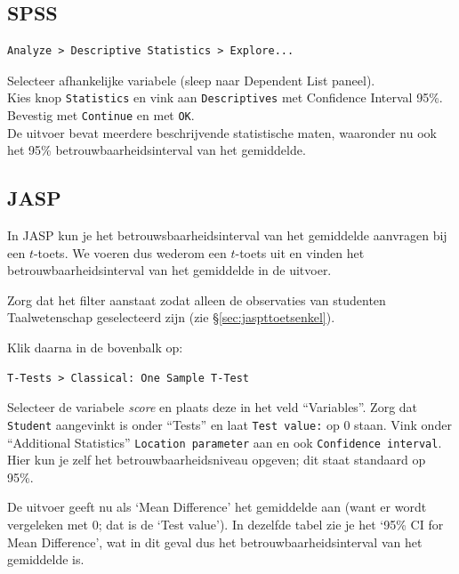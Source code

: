 \documentclass[
]{book}
\begin{document}
\hypertarget{spss-11}{%
\subsection{SPSS}\label{spss-11}}

\begin{verbatim}
Analyze > Descriptive Statistics > Explore...
\end{verbatim}

Selecteer afhankelijke variabele (sleep naar Dependent List paneel).\\
Kies knop \texttt{Statistics} en vink aan \texttt{Descriptives} met Confidence Interval
95\%.\\
Bevestig met \texttt{Continue} en met \texttt{OK}.\\
De uitvoer bevat meerdere beschrijvende statistische maten, waaronder nu
ook het 95\% betrouwbaarheidsinterval van het gemiddelde.

\hypertarget{jasp-12}{%
\subsection{JASP}\label{jasp-12}}

In JASP kun je het betrouwsbaarheidsinterval van het gemiddelde aanvragen bij een \(t\)-toets. We voeren dus wederom een \(t\)-toets uit en vinden het betrouwbaarheidsinterval van het gemiddelde in de uitvoer.

Zorg dat het filter aanstaat zodat alleen de observaties van studenten Taalwetenschap geselecteerd zijn (zie §\ref{sec:jaspttoetsenkel}).

Klik daarna in de bovenbalk op:

\begin{verbatim}
T-Tests > Classical: One Sample T-Test
\end{verbatim}

Selecteer de variabele \emph{score} en plaats deze in het veld ``Variables''. Zorg dat \texttt{Student} aangevinkt is onder ``Tests'' en laat \texttt{Test\ value:} op 0 staan. Vink onder ``Additional Statistics'' \texttt{Location\ parameter} aan en ook \texttt{Confidence\ interval}. Hier kun je zelf het betrouwbaarheidsniveau opgeven; dit staat standaard op 95\%.

De uitvoer geeft nu als `Mean Difference' het gemiddelde aan (want er wordt vergeleken met 0; dat is de `Test value'). In dezelfde tabel zie je het `95\% CI for Mean Difference', wat in dit geval dus het betrouwbaarheidsinterval van het gemiddelde is.
\end{document}
